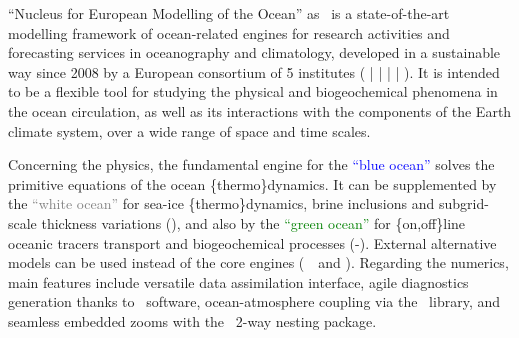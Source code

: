 
``Nucleus for European Modelling of the Ocean'' as \NEMO\ is a state-of-the-art modelling framework of
ocean-related engines for research activities and forecasting services in oceanography and climatology,
developed in a sustainable way since 2008 by a European consortium of 5 institutes
( |  |  |  | ).
It is intended to be a flexible tool for studying the physical and biogeochemical phenomena in
the ocean circulation, as well as its interactions with the components of the Earth climate system,
over a wide range of space and time scales.

Concerning the physics, the fundamental engine for the \textcolor{blue}{``blue ocean''} solves
the primitive equations of the ocean \{thermo\}dynamics.
It can be supplemented by the \textcolor{gray}{``white ocean''} for sea-ice \{thermo\}dynamics,
brine inclusions and subgrid-scale thickness variations (\SIcube), and also by
the \textcolor{green}{``green ocean''} for \{on,off\}line oceanic tracers transport and
biogeochemical processes (\TOP-\PISCES).
External alternative models can be used instead of the core engines (\eg\ \CICE\ and \BFM).
Regarding the numerics, main features include versatile data assimilation interface,
agile diagnostics generation thanks to \XIOS\ software,
ocean-atmosphere coupling via the \OASIS\ library, and
seamless embedded zooms with the \AGRIF\ 2-way nesting package.
